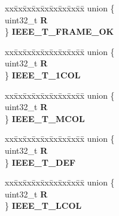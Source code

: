 \begin{DoxyCompactItemize}
\begin{tabbing}
\end{tabbing}\item 
\mbox{\label{structFEC__tag_a691fd2d7376c2bf36978bebe39b0b002}} 
\begin{tabbing}
xx\=xx\=xx\=xx\=xx\=xx\=xx\=xx\=xx\=\kill
union \{\\
\>uint32\_t {\bfseries R}\\
\} {\bfseries IEEE\_T\_FRAME\_OK}\\

\end{tabbing}\item 
\mbox{\label{structFEC__tag_a0a49eb0847eadf5242a6effc76c09b41}} 
\begin{tabbing}
xx\=xx\=xx\=xx\=xx\=xx\=xx\=xx\=xx\=\kill
union \{\\
\>uint32\_t {\bfseries R}\\
\} {\bfseries IEEE\_T\_1COL}\\

\end{tabbing}\item 
\mbox{\label{structFEC__tag_a5db1338079b038ae31e13914588a1e62}} 
\begin{tabbing}
xx\=xx\=xx\=xx\=xx\=xx\=xx\=xx\=xx\=\kill
union \{\\
\>uint32\_t {\bfseries R}\\
\} {\bfseries IEEE\_T\_MCOL}\\

\end{tabbing}\item 
\mbox{\label{structFEC__tag_aba61059c6f46a0154f37a67d0391fd4e}} 
\begin{tabbing}
xx\=xx\=xx\=xx\=xx\=xx\=xx\=xx\=xx\=\kill
union \{\\
\>uint32\_t {\bfseries R}\\
\} {\bfseries IEEE\_T\_DEF}\\

\end{tabbing}\item 
\mbox{\label{structFEC__tag_a6373d0e3955bbbde8db87857848fc8b6}} 
\begin{tabbing}
xx\=xx\=xx\=xx\=xx\=xx\=xx\=xx\=xx\=\kill
union \{\\
\>uint32\_t {\bfseries R}\\
\} {\bfseries IEEE\_T\_LCOL}\\


\end{tabbing}
\end{DoxyCompactItemize}
